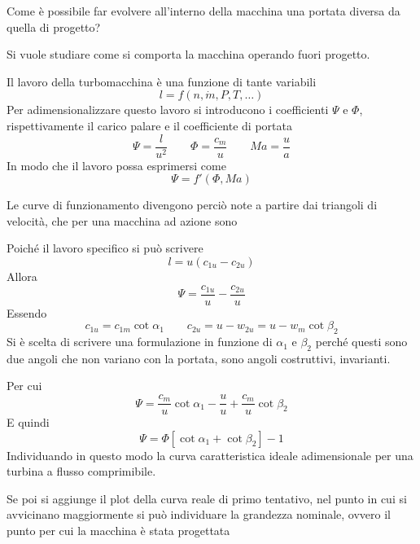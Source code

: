 \documentclass[a4paper, 15pt]{article}
\begin{document}
\begin{adjustwidth}{2in}{}
	Come è possibile far evolvere all'interno della macchina una portata diversa da quella di progetto? 
	
	Si vuole studiare come si comporta la macchina operando fuori progetto. \newline 
	
	Il lavoro della turbomacchina è una funzione di tante variabili
	\[l = f(n, \dot{m}, P, T, \dots)\]
	Per adimensionalizzare questo lavoro si introducono i coefficienti $\Psi$ e $\Phi$, rispettivamente il carico palare e il coefficiente di portata
	\[\Psi = \dfrac{l}{u^2}\qquad\Phi=\dfrac{c_m}{u}\qquad Ma = \dfrac{u}{a}\]
	In modo che il lavoro possa esprimersi come
	\[\Psi = f'(\Phi, Ma)\]
	
	Le curve di funzionamento divengono perciò note a partire dai triangoli di velocità, che per una macchina ad azione sono
	
	
	Poiché il lavoro specifico si può scrivere 
	\[l = u(c_{1u}-c_{2u})\]
	Allora 
	\[\Psi = \dfrac{c_{1u}}{u} - \dfrac{c_{2u}}{u}\]
	Essendo 
	\[c_{1u} = c_{1m}\cot\alpha_1\qquad c_{2u} = u-w_{2u} = u - w_m\cot\beta_2\]
	Si è scelta di scrivere una formulazione in funzione di $\alpha_1$ e $\beta_2$ perché questi sono due angoli che non variano con la portata, sono angoli costruttivi, invarianti.
	
	Per cui
	\[\Psi = \dfrac{c_m}{u}\cot\alpha_1 - \dfrac{u}{u}+\dfrac{c_m}{u}\cot\beta_2\]
	E quindi
	\[\Psi = \Phi\left[\cot\alpha_1+\cot\beta_2\right]-1\]
	Individuando in questo modo la curva caratteristica ideale adimensionale per una turbina a flusso comprimibile.
	
	Se poi si aggiunge il plot della curva reale di primo tentativo, nel punto in cui si avvicinano maggiormente si può individuare la grandezza nominale, ovvero il punto per cui la macchina è stata progettata 
	
	

\end{adjustwidth}
\end{document}

